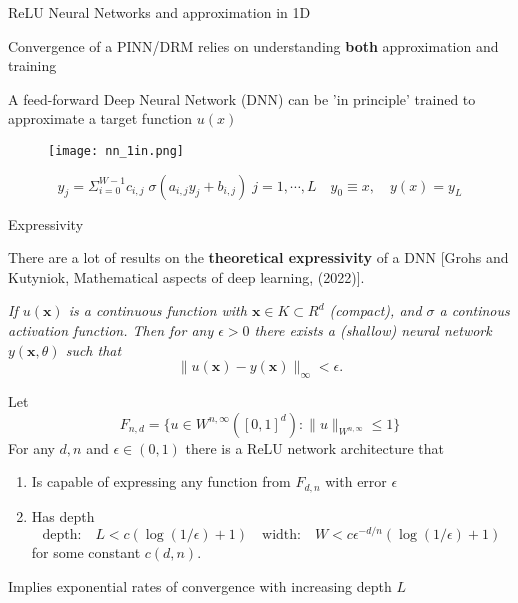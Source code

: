 \documentclass{beamer}
\begin{document}
\begin{frame}{ReLU Neural Networks and approximation in 1D}


{\color{blue} Convergence of a  PINN/DRM relies on understanding {\bf both} approximation and training}

\vspace{0.1in}

A feed-forward {\color{red}Deep Neural Network} (DNN) can be 'in principle' trained to approximate a target function $u(x)$ 

\vspace{1mm}
\begin{figure}
    \centering
    \texttt{[image: nn\_1in.png]}
    \label{fig:dnn_example}
\end{figure}

$$ y_{j} = \Sigma_{i=0}^{W-1}  c_{i,j} \; \sigma(a_{i,j} y_{j} + b_{i,j} ) \; j = 1, \cdots , L \quad y_{0} \equiv x, \quad y(x) = y_L$$

\end{frame}

\begin{frame}{Expressivity}

There are a {\color{red} lot of results} on the {\bf theoretical expressivity} of a DNN [Grohs and Kutyniok, Mathematical aspects of deep learning, (2022)]. 

\vspace{0.2in}

{\em 
{} If $u({\mathbf x})$ is a {\em continuous function} with ${\mathbf x} \in K \subset R^d$ (compact), and $\sigma$ a continous activation function. Then for any $\epsilon > 0$ there exists a (shallow) neural network $y({\mathbf x},\theta)$ such that
$$\|u({\mathbf x} )- y({\mathbf x}) \|_{\infty} < \epsilon.$$
}


\end{frame}
\begin{frame}

{\em 
{}

Let $$F_{n,d} = \{ u \in W^{n,\infty}([0,1]^d): \|u\|_{W^{n,\infty}} \le 1 \}$$
For any $d,n$ and $\epsilon \in (0,1)$ there is a ReLU network architecture that
\begin{enumerate}
\item Is capable of expressing any function from $F_{d,n}$ with error $\epsilon$
\item Has depth 
$$\mbox{depth:}  \quad L < c (\log(1/\epsilon) + 1) \quad \mbox{width:} \quad  W < c \epsilon^{-d/n} (\log(1/\epsilon) + 1)$$
for some constant $c(d,n)$.
\end{enumerate}
}

\vspace{0.1in}

{\color{blue} Implies exponential rates of convergence with increasing depth $L$ }

\vspace{0.2in}


\end{frame}
\end{document}
